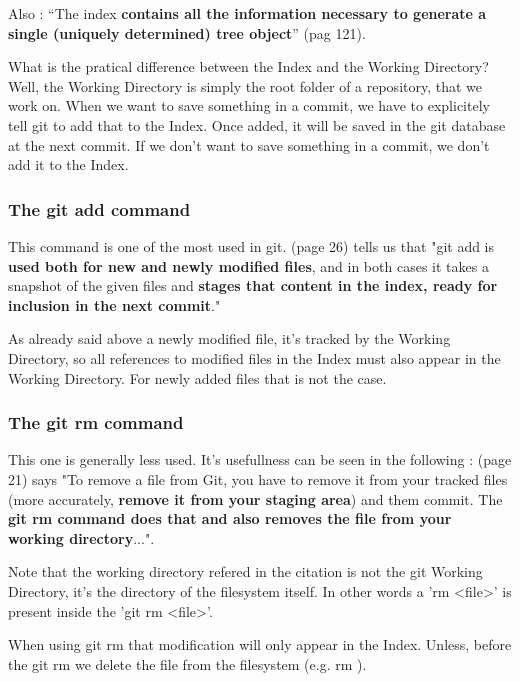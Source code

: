Also : ``The index {\bf contains all the information necessary to generate a single
(uniquely determined) tree object}'' \cite{gitComm} (pag 121). \par

What is the pratical difference between the Index and the Working
Directory? Well, the Working Directory is simply the root folder of a repository,
that we work on. When we want to save something in a commit, we have to explicitely 
tell git to add that to the Index. Once added, it
will be saved in the git database at the next commit. If we don't want to save
something in a commit, we  don't add it to the Index.

\subsubsection{The git add command}

This command is one of the most used in git. \cite{gitComm} (page 26)
tells us that
"git add is {\bf used both for new and newly modified files},
and in both cases it takes a snapshot of the given files
and {\bf stages that content in the index, ready for inclusion
in the next commit}." \par 
As already said above a newly modified file, it's tracked by
the Working Directory, so all references to modified files in
the Index must also appear in the Working Directory. For newly
added files that is not the case.

\subsubsection{The git rm command}

This one is generally less used. It's usefullness can be
seen in the following : \cite{progit}
(page 21) says "To remove a file from Git, you have to remove it
from your tracked files (more accurately, {\bf remove it from your
staging area}) and them commit. The {\bf git rm command does that
and also removes the file from your working directory}...". \par
Note that the working directory refered in the citation is not
the git Working Directory, it's the directory of the filesystem itself.
In other words a 'rm <file>' is present inside the 'git rm <file>'. \par
When using git rm
that modification will only appear in the Index. Unless, before
the git rm we delete the file from the filesystem (e.g. rm ). \par


